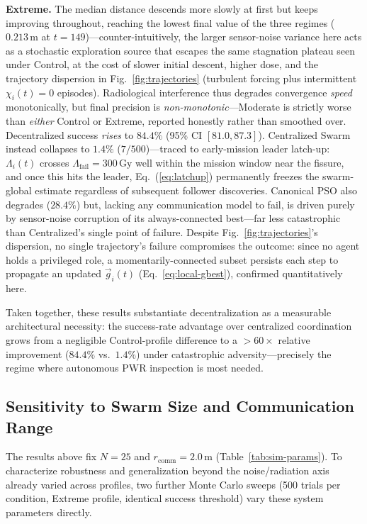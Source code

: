\documentclass[conference]{IEEEtran}
\begin{document}
\textbf{Extreme.} The median distance descends more slowly at first but keeps improving throughout, reaching the lowest final value of the three regimes ($0.213\,\text{m}$ at $t=149$)---counter-intuitively, the larger sensor-noise variance here acts as a stochastic exploration source that escapes the same stagnation plateau seen under Control, at the cost of slower initial descent, higher dose, and the trajectory dispersion in Fig.~\ref{fig:trajectories} (turbulent forcing plus intermittent $\chi_i(t)=0$ episodes). Radiological interference thus degrades convergence \emph{speed} monotonically, but final precision is \emph{non-monotonic}---Moderate is strictly worse than \emph{either} Control or Extreme, reported honestly rather than smoothed over. Decentralized success \emph{rises} to $84.4\%$ (95\% CI $[81.0,87.3]$). Centralized Swarm instead collapses to $1.4\%$ ($7/500$)---traced to early-mission leader latch-up: $\Lambda_i(t)$ crosses $\Lambda_{\text{fail}}=300\,\text{Gy}$ well within the mission window near the fissure, and once this hits the leader, Eq.~(\ref{eq:latchup}) permanently freezes the swarm-global estimate regardless of subsequent follower discoveries. Canonical PSO also degrades ($28.4\%$) but, lacking any communication model to fail, is driven purely by sensor-noise corruption of its always-connected best---far less catastrophic than Centralized's single point of failure. Despite Fig.~\ref{fig:trajectories}'s dispersion, no single trajectory's failure compromises the outcome: since no agent holds a privileged role, a momentarily-connected subset persists each step to propagate an updated $\vec{g}_i(t)$ (Eq.~\ref{eq:local-gbest}), confirmed quantitatively here.

Taken together, these results substantiate decentralization as a measurable architectural necessity: the success-rate advantage over centralized coordination grows from a negligible Control-profile difference to a $>60\times$ relative improvement ($84.4\%$ vs.\ $1.4\%$) under catastrophic adversity---precisely the regime where autonomous PWR inspection is most needed.

\subsection{Sensitivity to Swarm Size and Communication Range}
\label{sec:sensitivity}

The results above fix $N=25$ and $r_{\text{comm}}=2.0\,\text{m}$ (Table~\ref{tab:sim-params}). To characterize robustness and generalization beyond the noise/radiation axis already varied across profiles, two further Monte Carlo sweeps (500 trials per condition, Extreme profile, identical success threshold) vary these system parameters directly.
\end{document}
